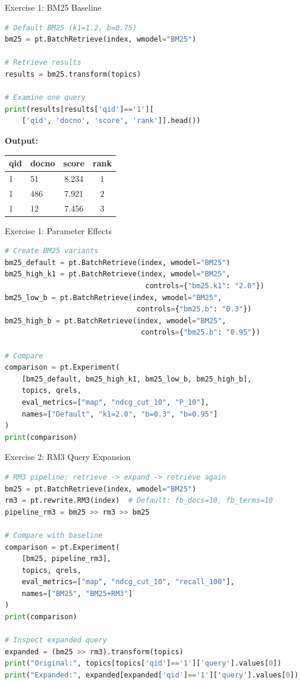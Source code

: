 \documentclass[aspectratio=169]{beamer}
\begin{document}
\begin{frame}[fragile]{Exercise 1: BM25 Baseline}
\begin{lstlisting}[language=Python]
# Default BM25 (k1=1.2, b=0.75)
bm25 = pt.BatchRetrieve(index, wmodel="BM25")

# Retrieve results
results = bm25.transform(topics)

# Examine one query
print(results[results['qid']=='1'][
    ['qid', 'docno', 'score', 'rank']].head())
\end{lstlisting}

\vspace{1em}

\textbf{Output:}
\begin{table}
\tiny
\begin{tabular}{llcc}
\toprule
qid & docno & score & rank \\
\midrule
1 & 51 & 8.234 & 1 \\
1 & 486 & 7.921 & 2 \\
1 & 12 & 7.456 & 3 \\
\bottomrule
\end{tabular}
\end{table}
\end{frame}

\begin{frame}[fragile]{Exercise 1: Parameter Effects}
\begin{lstlisting}[language=Python]
# Create BM25 variants
bm25_default = pt.BatchRetrieve(index, wmodel="BM25")
bm25_high_k1 = pt.BatchRetrieve(index, wmodel="BM25", 
                                 controls={"bm25.k1": "2.0"})
bm25_low_b = pt.BatchRetrieve(index, wmodel="BM25", 
                               controls={"bm25.b": "0.3"})
bm25_high_b = pt.BatchRetrieve(index, wmodel="BM25", 
                                controls={"bm25.b": "0.95"})

# Compare
comparison = pt.Experiment(
    [bm25_default, bm25_high_k1, bm25_low_b, bm25_high_b],
    topics, qrels,
    eval_metrics=["map", "ndcg_cut_10", "P_10"],
    names=["Default", "k1=2.0", "b=0.3", "b=0.95"]
)
print(comparison)
\end{lstlisting}
\end{frame}

\begin{frame}[fragile]{Exercise 2: RM3 Query Expansion}
\begin{lstlisting}[language=Python]
# RM3 pipeline: retrieve -> expand -> retrieve again
bm25 = pt.BatchRetrieve(index, wmodel="BM25")
rm3 = pt.rewrite.RM3(index)  # Default: fb_docs=10, fb_terms=10
pipeline_rm3 = bm25 >> rm3 >> bm25

# Compare with baseline
comparison = pt.Experiment(
    [bm25, pipeline_rm3],
    topics, qrels,
    eval_metrics=["map", "ndcg_cut_10", "recall_100"],
    names=["BM25", "BM25+RM3"]
)
print(comparison)

# Inspect expanded query
expanded = (bm25 >> rm3).transform(topics)
print("Original:", topics[topics['qid']=='1']['query'].values[0])
print("Expanded:", expanded[expanded['qid']=='1']['query'].values[0])
\end{lstlisting}
\end{frame}
\end{document}
